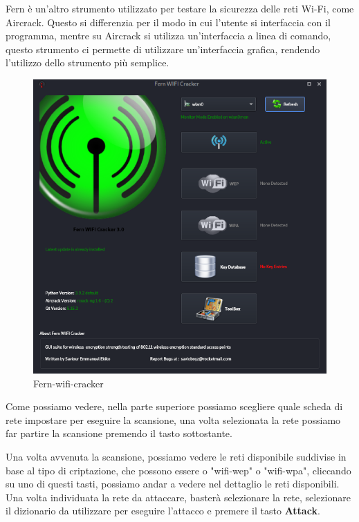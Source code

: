 Fern\cite{fern} è un'altro strumento utilizzato per testare la sicurezza delle reti Wi-Fi, come Aircrack. Questo si differenzia per il modo in cui l'utente si interfaccia con il programma, mentre su Aircrack si utilizza un'interfaccia a linea di comando, questo strumento ci permette di utilizzare un'interfaccia grafica, rendendo l'utilizzo dello strumento più semplice.

\begin{figure}[ht]
    \centering
    \includegraphics[width=\linewidth]{Immagini/6/fern_1.png}
    \caption{Fern-wifi-cracker}
    \label{fig:Fern example}
\end{figure}

Come possiamo vedere, nella parte superiore possiamo scegliere quale scheda di rete impostare per eseguire la scansione, una volta selezionata la rete possiamo far partire la scansione premendo il tasto sottostante.
\newpage

Una volta avvenuta la scansione, possiamo vedere le reti disponibile suddivise in base al tipo di criptazione, che possono essere o "wifi-wep" o "wifi-wpa", cliccando su uno di questi tasti, possiamo andar a vedere nel dettaglio le reti disponibili. Una volta individuata la rete da attaccare, basterà selezionare la rete, selezionare il dizionario da utilizzare per eseguire l'attacco e premere il tasto \textbf{Attack}.

